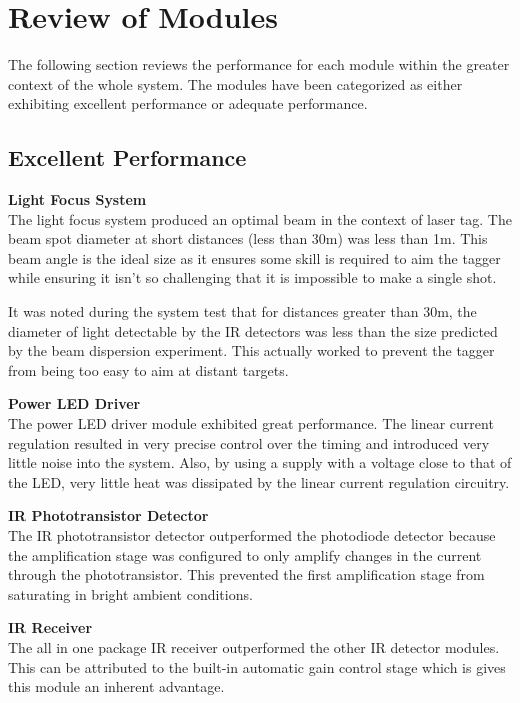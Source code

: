 \section{Review of Modules}
The following section reviews the performance for each module within the greater context of the whole system. The modules have been categorized as either exhibiting excellent performance or adequate performance.




\subsection{Excellent Performance}

\textbf{Light Focus System}\\
The light focus system produced an optimal beam in the context of laser tag. The beam spot diameter at short distances (less than 30m) was less than 1m. This beam angle is the ideal size as it ensures some skill is required to aim the tagger while ensuring it isn't so challenging that it is impossible to make a single shot.

It was noted during the system test that for distances greater than 30m, the diameter of light detectable by the IR detectors was less than the size predicted by the beam dispersion experiment. This actually worked to prevent the tagger from being too easy to aim at distant targets.

\textbf{Power LED Driver}\\
The power LED driver module exhibited great performance. The linear current regulation resulted in very precise control over the timing and introduced very little noise into the system. Also, by using a supply with a voltage close to that of the LED, very little heat was dissipated by the linear current regulation circuitry.

\textbf{IR Phototransistor Detector}\\
The IR phototransistor detector outperformed the photodiode detector because the amplification stage was configured to only amplify changes in the current through the phototransistor. This prevented the first amplification stage from saturating in bright ambient conditions.

\textbf{IR Receiver}\\
The all in one package IR receiver outperformed the other IR detector modules. This can be attributed to the built-in automatic gain control stage which is gives this module an inherent advantage.

